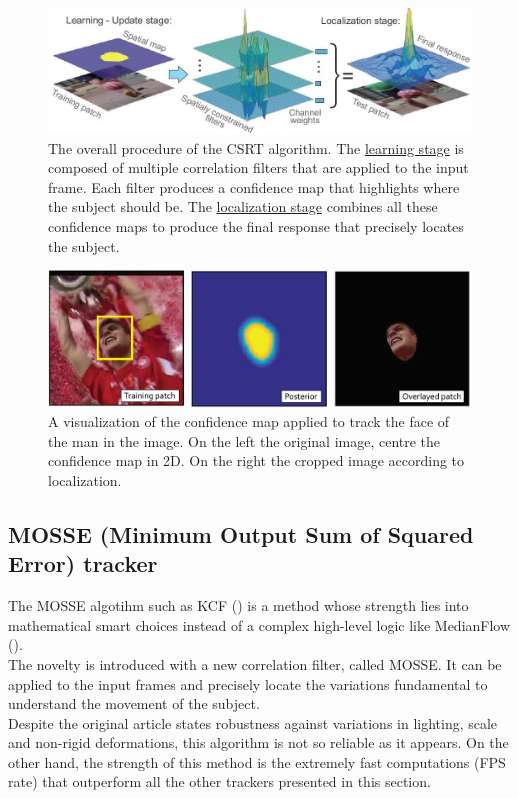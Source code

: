 \begin{figure}[!h]
	\centering
	\includegraphics[width=1\linewidth]{images/tracking/howItWorks_CSRT}
	\captionsetup{margin=0.5cm}
	\caption[The general intuition of the CSRT algorithm.]{The overall procedure of the CSRT algorithm. The \underline{learning stage} is composed of multiple correlation filters that are applied to the input frame. Each filter produces a confidence map that highlights where the subject should be. The \underline{localization stage} combines all these confidence maps to produce the final response that precisely locates the subject.}
	\label{fig:howItWorks_CSRT}
\end{figure}
\begin{figure}[!h]
	\centering
	\includegraphics[width=0.8\linewidth]{images/tracking/sample_CSRT}
	\captionsetup{margin=0.5cm}
	\caption[An example of application of CSRT on a frame.]{A visualization of the confidence map applied to track the face of the man in the image. On the left the original image, centre the confidence map in 2D. On the right the cropped image according to localization.}
	\label{fig:sample_CSRT}
\end{figure}


\subsection{MOSSE (Minimum Output Sum of Squared Error) tracker}
The MOSSE algotihm\cite{mosse} such as KCF () is a method whose strength lies into mathematical smart choices instead of a complex high-level logic like MedianFlow ().\\
The novelty is introduced with a new correlation filter, called MOSSE. It can be applied to the input frames and precisely locate the variations fundamental to understand the movement of the subject.\\
Despite the original article states robustness against variations in lighting, scale and non-rigid deformations, this algorithm is not so reliable as it appears. On the other hand, the strength of this method is the extremely fast computations (FPS rate) that outperform all the other trackers presented in this section.

